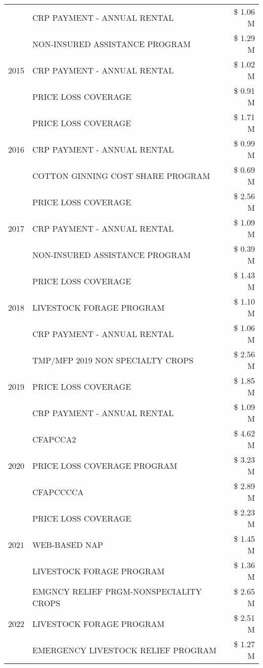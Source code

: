 \begin{tabular}{llr}
 & CRP PAYMENT - ANNUAL RENTAL & \$ 1.06 M \\
\cline{1-3}
\multirow[t]{3}{*}{2015} & NON-INSURED ASSISTANCE PROGRAM & \$ 1.29 M \\
 & CRP PAYMENT - ANNUAL RENTAL & \$ 1.02 M \\
 & PRICE LOSS COVERAGE & \$ 0.91 M \\
\cline{1-3}
\multirow[t]{3}{*}{2016} & PRICE LOSS COVERAGE & \$ 1.71 M \\
 & CRP PAYMENT - ANNUAL RENTAL & \$ 0.99 M \\
 & COTTON GINNING COST SHARE PROGRAM & \$ 0.69 M \\
\cline{1-3}
\multirow[t]{3}{*}{2017} & PRICE LOSS COVERAGE & \$ 2.56 M \\
 & CRP PAYMENT - ANNUAL RENTAL & \$ 1.09 M \\
 & NON-INSURED ASSISTANCE PROGRAM & \$ 0.39 M \\
\cline{1-3}
\multirow[t]{3}{*}{2018} & PRICE LOSS COVERAGE & \$ 1.43 M \\
 & LIVESTOCK FORAGE PROGRAM & \$ 1.10 M \\
 & CRP PAYMENT - ANNUAL RENTAL & \$ 1.06 M \\
\cline{1-3}
\multirow[t]{3}{*}{2019} & TMP/MFP 2019 NON SPECIALTY CROPS & \$ 2.56 M \\
 & PRICE LOSS COVERAGE & \$ 1.85 M \\
 & CRP PAYMENT - ANNUAL RENTAL & \$ 1.09 M \\
\cline{1-3}
\multirow[t]{3}{*}{2020} & CFAPCCA2 & \$ 4.62 M \\
 & PRICE LOSS COVERAGE PROGRAM & \$ 3.23 M \\
 & CFAPCCCCA & \$ 2.89 M \\
\cline{1-3}
\multirow[t]{3}{*}{2021} & PRICE LOSS COVERAGE & \$ 2.23 M \\
 & WEB-BASED NAP & \$ 1.45 M \\
 & LIVESTOCK FORAGE PROGRAM & \$ 1.36 M \\
\cline{1-3}
\multirow[t]{3}{*}{2022} & EMGNCY RELIEF PRGM-NONSPECIALITY CROPS & \$ 2.65 M \\
 & LIVESTOCK FORAGE PROGRAM & \$ 2.51 M \\
 & EMERGENCY LIVESTOCK RELIEF PROGRAM & \$ 1.27 M \\
\cline{1-3}
\bottomrule
\end{tabular}
